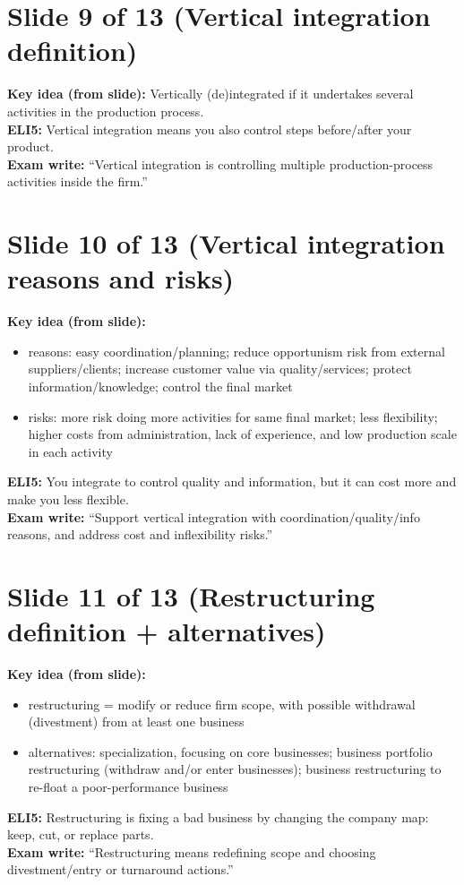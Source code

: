\documentclass[11pt,a4paper]{article}
\begin{document}
\section*{Slide 9 of 13 (Vertical integration definition)}
\textbf{Key idea (from slide):} Vertically (de)integrated if it undertakes several activities in the production process.\\
\textbf{ELI5:} Vertical integration means you also control steps before/after your product.\\
\textbf{Exam write:} ``Vertical integration is controlling multiple production-process activities inside the firm.''

\section*{Slide 10 of 13 (Vertical integration reasons and risks)}
\textbf{Key idea (from slide):}
\begin{itemize}
  \item reasons: easy coordination/planning; reduce opportunism risk from external suppliers/clients; increase customer value via quality/services; protect information/knowledge; control the final market
  \item risks: more risk doing more activities for same final market; less flexibility; higher costs from administration, lack of experience, and low production scale in each activity
\end{itemize}
\textbf{ELI5:} You integrate to control quality and information, but it can cost more and make you less flexible.\\
\textbf{Exam write:} ``Support vertical integration with coordination/quality/info reasons, and address cost and inflexibility risks.''

\section*{Slide 11 of 13 (Restructuring definition + alternatives)}
\textbf{Key idea (from slide):}
\begin{itemize}
  \item restructuring = modify or reduce firm scope, with possible withdrawal (divestment) from at least one business
  \item alternatives: specialization, focusing on core businesses; business portfolio restructuring (withdraw and/or enter businesses); business restructuring to re-float a poor-performance business
\end{itemize}
\textbf{ELI5:} Restructuring is fixing a bad business by changing the company map: keep, cut, or replace parts.\\
\textbf{Exam write:} ``Restructuring means redefining scope and choosing divestment/entry or turnaround actions.''
\end{document}
